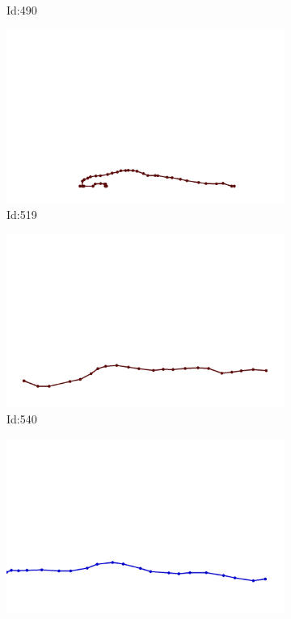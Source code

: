 \documentclass[12pt,twoside]{report}
\begin{document}
\begin{figure}
\begin{subfigure}[b]{0.20\textwidth}
\caption{Id:490}
\end{subfigure}
\begin{subfigure}[b]{0.20\textwidth}
\centering
\includegraphics[width=\textwidth]{../trajectories/519.png}
\caption{Id:519}
\end{subfigure}
\begin{subfigure}[b]{0.20\textwidth}
\centering
\includegraphics[width=\textwidth]{../trajectories/540.png}
\caption{Id:540}
\end{subfigure}
\begin{subfigure}[b]{0.20\textwidth}
\centering
\includegraphics[width=\textwidth]{../trajectories/553.png}

\end{subfigure}
\end{figure}
\end{document}
